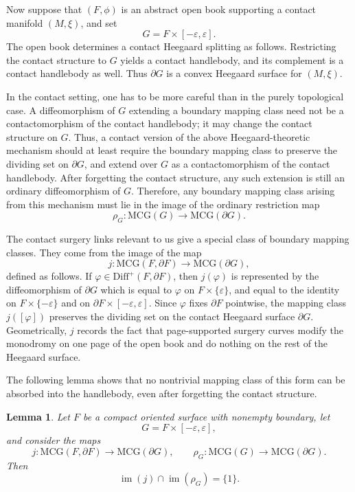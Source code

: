 \documentclass{amsart}
\numberwithin{equation}{section}
\numberwithin{figure}{section}
\newtheorem{lemma}[theorem]{Lemma}
\theoremstyle{definition}
\theoremstyle{remark}
\let\olddxi\xi %
\renewcommand{\xi}{\olddxi}
\newcommand{\MCG}{\mathrm{MCG}}
\begin{document}
Now suppose that \((F,\phi)\) is an abstract open book supporting a contact manifold \((M,\xi)\), and set
\[
G=F\times[-\varepsilon,\varepsilon].
\]
The open book determines a contact Heegaard splitting as follows. Restricting the contact structure to \(G\) yields a contact handlebody, and its complement is a contact handlebody as well. Thus \(\partial G\) is a convex Heegaard surface for \((M,\xi)\).

In the contact setting, one has to be more careful than in the purely topological case. A diffeomorphism of \(G\) extending a boundary mapping class need not be a contactomorphism of the contact handlebody; it may change the contact structure on \(G\). Thus, a contact version of the above Heegaard-theoretic mechanism should at least require the boundary mapping class to preserve the dividing set on \(\partial G\), and extend over \(G\) as a contactomorphism of the contact handlebody. After forgetting the contact structure, any such extension is still an ordinary diffeomorphism of \(G\). Therefore, any boundary mapping class arising from this mechanism must lie in the image of the ordinary restriction map
\[
\rho_G\colon \MCG(G)\longrightarrow \MCG(\partial G).
\]

The contact surgery links relevant to us give a special class of boundary mapping classes. They come from the image of the map
\[
j\colon \MCG(F,\partial F)\longrightarrow \MCG(\partial G),
\]
defined as follows. If \(\varphi\in\mathrm{Diff}^+(F,\partial F)\), then \(j(\varphi)\) is represented by the diffeomorphism of \(\partial G\) which is equal to \(\varphi\) on \(F\times\{\varepsilon\}\), and equal to the identity on \(F\times\{-\varepsilon\}\) and on \(\partial F\times[-\varepsilon,\varepsilon]\). Since \(\varphi\) fixes \(\partial F\) pointwise, the mapping class \(j([\varphi])\) preserves the dividing set on the contact Heegaard surface \(\partial G\). Geometrically, \(j\) records the fact that page-supported surgery curves modify the monodromy on one page of the open book and do nothing on the rest of the Heegaard surface.

The following lemma shows that no nontrivial mapping class of this form can be absorbed into the handlebody, even after forgetting the contact structure.

\begin{lemma}\label{lem:trivial_intersection}
Let \(F\) be a compact oriented surface with nonempty boundary, let
\[
G=F\times[-\varepsilon,\varepsilon],
\]
and consider the maps
\[
j\colon \MCG(F,\partial F)\to \MCG(\partial G),
\qquad
\rho_G\colon \MCG(G)\to \MCG(\partial G).
\]
Then
\[
\operatorname{im}(j)\cap \operatorname{im}(\rho_G)=\{1\}.
\]
\end{lemma}
\end{document}
